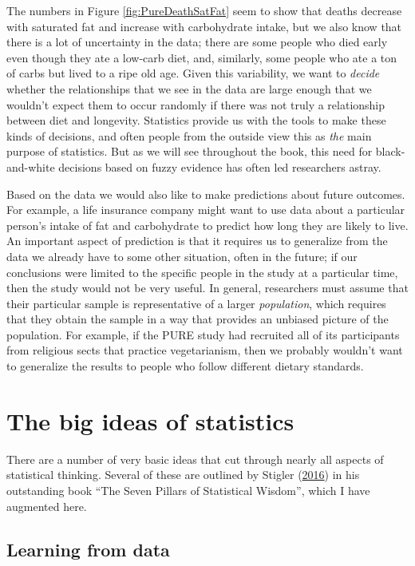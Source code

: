 \documentclass[
  12pt,
]{book}
\begin{document}
The numbers in Figure \ref{fig:PureDeathSatFat} seem to show that deaths decrease with saturated fat and increase with carbohydrate intake, but we also know that there is a lot of uncertainty in the data; there are some people who died early even though they ate a low-carb diet, and, similarly, some people who ate a ton of carbs but lived to a ripe old age. Given this variability, we want to \emph{decide} whether the relationships that we see in the data are large enough that we wouldn't expect them to occur randomly if there was not truly a relationship between diet and longevity. Statistics provide us with the tools to make these kinds of decisions, and often people from the outside view this as \emph{the} main purpose of statistics. But as we will see throughout the book, this need for black-and-white decisions based on fuzzy evidence has often led researchers astray.

Based on the data we would also like to make predictions about future outcomes. For example, a life insurance company might want to use data about a particular person's intake of fat and carbohydrate to predict how long they are likely to live. An important aspect of prediction is that it requires us to generalize from the data we already have to some other situation, often in the future; if our conclusions were limited to the specific people in the study at a particular time, then the study would not be very useful. In general, researchers must assume that their particular sample is representative of a larger \emph{population}, which requires that they obtain the sample in a way that provides an unbiased picture of the population. For example, if the PURE study had recruited all of its participants from religious sects that practice vegetarianism, then we probably wouldn't want to generalize the results to people who follow different dietary standards.

\hypertarget{the-big-ideas-of-statistics}{%
\section{The big ideas of statistics}\label{the-big-ideas-of-statistics}}

There are a number of very basic ideas that cut through nearly all aspects of statistical thinking. Several of these are outlined by Stigler (\protect\hyperlink{ref-stig}{2016}) in his outstanding book ``The Seven Pillars of Statistical Wisdom'', which I have augmented here.

\hypertarget{learning-from-data}{%
\subsection{Learning from data}\label{learning-from-data}}
\end{document}
